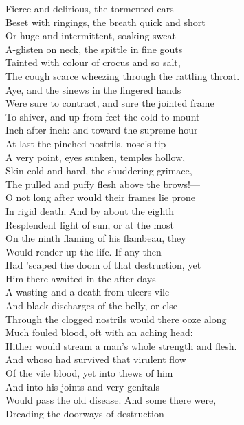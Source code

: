 Fierce and delirious, the tormented ears\\
Beset with ringings, the breath quick and short\\
Or huge and intermittent, soaking sweat\\
A-glisten on neck, the spittle in fine gouts\\
Tainted with colour of crocus and so salt,\\
The cough scarce wheezing through the rattling throat.\\
Aye, and the sinews in the fingered hands\\
Were sure to contract, and sure the jointed frame\\
To shiver, and up from feet the cold to mount\\
Inch after inch: and toward the supreme hour\\
At last the pinched nostrils, nose's tip\\
A very point, eyes sunken, temples hollow,\\
Skin cold and hard, the shuddering grimace,\\
The pulled and puffy flesh above the brows!—\\
O not long after would their frames lie prone\\
In rigid death. And by about the eighth\\
Resplendent light of sun, or at the most\\
On the ninth flaming of his flambeau, they\\
Would render up the life. If any then\\
Had 'scaped the doom of that destruction, yet\\
Him there awaited in the after days\\
A wasting and a death from ulcers vile\\
And black discharges of the belly, or else\\
Through the clogged nostrils would there ooze along\\
Much fouled blood, oft with an aching head:\\
Hither would stream a man's whole strength and flesh.\\
And whoso had survived that virulent flow\\
Of the vile blood, yet into thews of him\\
And into his joints and very genitals\\
Would pass the old disease. And some there were,\\
Dreading the doorways of destruction\\
